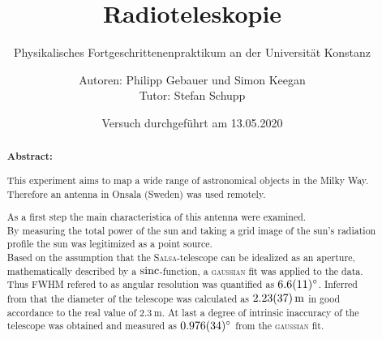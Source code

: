 \title{Radioteleskopie}
\subtitle{Physikalisches Fortgeschrittenenpraktikum an der Universität Konstanz}
\author{Autoren: Philipp Gebauer und Simon Keegan \\ \large{Tutor: Stefan Schupp}}
\date{Versuch durchgeführt am 13.05.2020}
\maketitle
\vspace{2.5 cm}
\begin{abstract}
    \vspace{1cm}
    \noindent \textbf{Abstract:}
    \begin{singlespace}
    This experiment aims to map a wide range of astronomical objects in the Milky Way. Therefore an antenna in Onsala (Sweden) was used remotely.

    As a first step the main characteristica of this antenna were examined.\\
    By measuring the total power of the sun and taking a grid image of the sun's radiation profile the sun was legitimized as a point source. \\
    Based on the assumption that the \textsc{Salsa}-telescope can be idealized as an aperture, mathematically described by a $\operatorname{sinc}$-function, a \textsc{gaussian} fit was applied to the data. Thus FWHM refered to as angular resolution was quantified as $\SI{6.6 \pm 1.1}{\degree}$. Inferred from that the diameter of the telescope was calculated as $\SI{2.23 \pm 0.37}{\metre}$ in good accordance to the real value of $\SI{2.3}{\metre}$. At last a degree of intrinsic inaccuracy of the telescope was obtained and measured as $\SI{0.976 \pm 0.034}{\degree}$ from the \textsc{gaussian} fit.
    \end{singlespace}
\end{abstract}
\thispagestyle{empty}
\newpage
